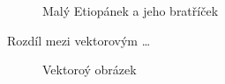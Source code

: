 \documentclass[a4paper, 11pt]{article}
\begin{document}
\begin{figure}[h!]
\begin{center}
{}
\end{center}
\caption{Malý Etiopánek a jeho bratříček}
\end{figure}

\pagebreak

Rozdíl mezi vektorovým \dots
\begin{figure}[h!]
\begin{center}
\end{center}
\caption{Vektoroý obrázek}
\end{figure}
\end{document}
